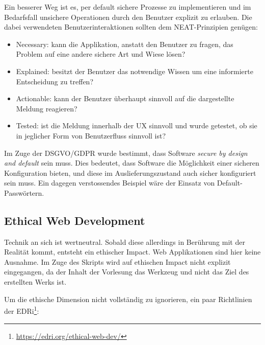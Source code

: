 Ein besserer Weg ist es, per default sichere Prozesse zu implementieren und im Bedarfsfall unsichere Operationen durch den Benutzer explizit zu erlauben. Die dabei verwendeten Benutzerinteraktionen sollten dem NEAT-Prinzipien genügen:

\begin{itemize}
	\item Necessary: kann die Applikation, anstatt den Benutzer zu fragen, das Problem auf eine andere sichere Art und Wiese lösen?
	\item Explained: besitzt der Benutzer das notwendige Wissen um eine informierte Entscheidung zu treffen?
	\item Actionable: kann der Benutzer überhaupt sinnvoll auf die dargestellte Meldung reagieren?
	\item Tested: ist die Meldung innerhalb der UX sinnvoll und wurde getestet, ob sie in jeglicher Form von Benutzerfluss sinnvoll ist?
\end{itemize}

Im Zuge der DSGVO/GDPR wurde bestimmt, dass Software \textit{secure by design and default} sein muss. Dies bedeutet, dass Software die Möglichkeit einer sicheren Konfiguration bieten, und diese im Auslieferungszustand auch sicher konfiguriert sein muss. Ein dagegen verstossendes Beispiel wäre der Einsatz von Default-Passwörtern.

\subsection{Ethical Web Development}

Technik an sich ist wertneutral. Sobald diese allerdings in Berührung mit der Realität kommt, entsteht ein ethischer Impact. Web Applikationen sind hier keine Ausnahme. Im Zuge des Skripts wird auf ethischen Impact nicht explizit eingegangen, da der Inhalt der Vorlesung das Werkzeug und nicht das Ziel des erstellten Werks ist.

Um die ethische Dimension nicht vollständig zu ignorieren, ein paar Richtlinien der EDRi\footnote{\url{https://edri.org/ethical-web-dev/}}:

